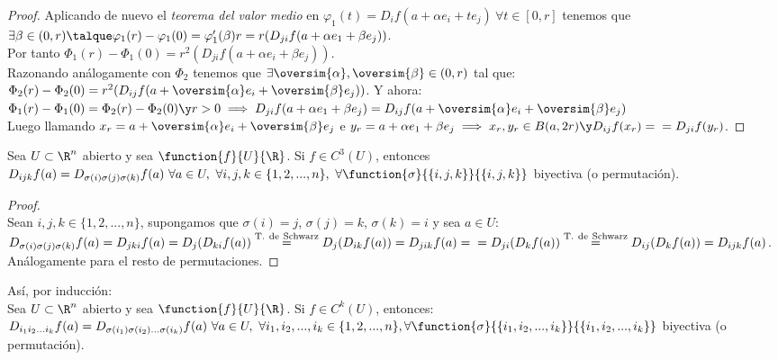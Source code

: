 \begin{teor}
\begin{proof}
	Aplicando de nuevo el \textit{teorema del valor medio} en $\varphi_1(t)=D_if(a+\alpha e_i+te_j)\ \forall t\in[0,r]$ tenemos que $\exists \beta\in (0,r)\talque \varphi_1(r)-\varphi_1(0)=\varphi_1'(\beta)r=r(D_{ji}f(a+\alpha e_1+\beta e_j))$.\\
	Por tanto $\Phi_1(r)-\Phi_1(0)=r^2(D_{ji}f(a+\alpha e_i+\beta e_j))$.\\
	Razonando análogamente con $\Phi_2$ tenemos que $\exists \oversim{\alpha},\oversim{\beta}\in(0,r)$ tal que:\\
	$\Phi_2(r)-\Phi_2(0)=r^2(D_{ij}f(a+\oversim{\alpha} e_i+\oversim{\beta} e_j))$. Y ahora:\\
	$\Phi_1(r)-\Phi_1(0)=\Phi_2(r)-\Phi_2(0)\y r>0\implies D_{ji}f(a+\alpha e_1+\beta e_j)=D_{ij}f(a+\oversim{\alpha} e_i+\oversim{\beta} e_j)$\\
	Luego llamando $x_r = a+\oversim{\alpha} e_i+\oversim{\beta} e_j$ e $y_r = a+\alpha e_1+\beta e_j\implies x_r,y_r\in B(a,2r)\y D_{ij}f(x_r)=\\
	=D_{ji}f(y_r)$.
	\end{proof}
	\end{teor}
	
	\begin{corolario} Sea $U\subset\R^n$ abierto y sea $\function{f}{U}{\R}$. Si $f\in C^3(U)$, entonces\\
	$D_{ijk}f(a)=D_{\sigma(i)\sigma(j)\sigma(k)}f(a)\ \forall a\in U,\ \forall i,j,k\in\{1,2,...,n\},\ \forall\function{\sigma}{\{i,j,k\}}{\{i,j,k\}}$ biyectiva (o permutación).
	\begin{proof}\ \\
	Sean $i,j,k\in\{1,2,...,n\}$, supongamos que $\sigma(i)=j$, $\sigma(j)=k$, $\sigma(k)=i$ y sea $a\in U$:\\
	$D_{\sigma(i)\sigma(j)\sigma(k)}f(a)=D_{jki}f(a)=D_j(D_{ki}f(a))\overset{\mathrm{T.\ de\ Schwarz}}=D_j(D_{ik}f(a))=D_{jik}f(a)=\\
	=D_{ji}(D_kf(a))\overset{\mathrm{T.\ de\ Schwarz}}=D_{ij}(D_kf(a))=D_{ijk}f(a)$.\\
	Análogamente para el resto de permutaciones.
	\end{proof}
	\end{corolario}
	
	\begin{corolario} Así, por inducción:\\
	Sea $U\subset\R^n$ abierto y sea $\function{f}{U}{\R}$. Si $f\in C^k(U)$, entonces:\\
	$D_{i_1i_2...i_k}f(a)=D_{\sigma(i_1)\sigma(i_2)...\sigma(i_k)}f(a)\ \forall a\in U,\ \forall i_1,i_2,...,i_k\in\{1,2,...,n\},\\
	\forall\function{\sigma}{\{i_1,i_2,...,i_k\}}{\{i_1,i_2,...,i_k\}}$ biyectiva (o permutación).
	\end{corolario}
	
